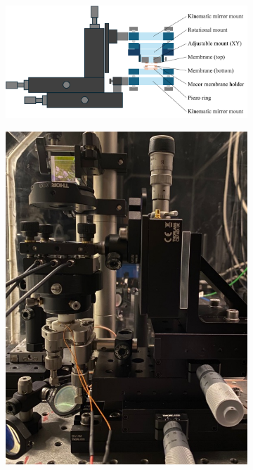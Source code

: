 \begin{figure}[h!]
    \centering
    \begin{subfigure}[b]{0.74\textwidth}
        \includegraphics[width=\textwidth]{figures/setup_skecth_zoomed.pdf}
        \caption{}
        \label{fig:setup_zoomed}
    \end{subfigure}
    \begin{subfigure}[b]{0.25\textwidth}
        \includegraphics[width=\textwidth]{figures/cavity_setup_pic.pdf}

\end{subfigure}
\end{figure}
